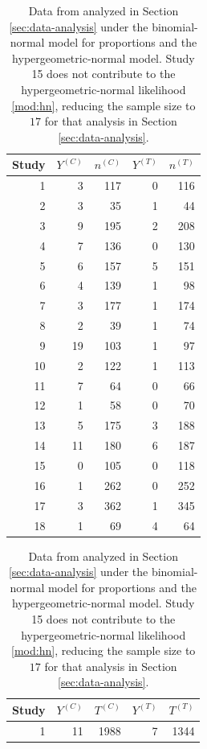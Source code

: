 \documentclass[12pt]{article}
\newcommand{\Y}{Y}
\newcommand{\T}[1]{{#1}^{(T)}}
\newcommand{\C}[1]{{#1}^{(C)}}
\newcommand{\n}{n}
\begin{document}
\begin{table}[htbp]
  \centering
  \begin{minipage}[t]{0.48\textwidth}
    \centering
    \begin{tabular}{rrrrr}
      \toprule
      Study & $\C{\Y}$ & $\C{\n}$ & $\T{\Y}$ & $\T{\n}$ \\
      \midrule
      1  & 3  & 117 & 0 & 116 \\
      2  & 3  & 35  & 1 & 44  \\
      3  & 9  & 195 & 2 & 208 \\
      4  & 7  & 136 & 0 & 130 \\
      5  & 6  & 157 & 5 & 151 \\
      6  & 4  & 139 & 1 & 98  \\
      7  & 3  & 177 & 1 & 174 \\
      8  & 2  & 39  & 1 & 74  \\
      9  & 19 & 103 & 1 & 97  \\
      10 & 2  & 122 & 1 & 113 \\
      11 & 7  & 64  & 0 & 66  \\
      12 & 1  & 58  & 0 & 70  \\
      13 & 5  & 175 & 3 & 188 \\
      14 & 11 & 180 & 6 & 187 \\
      15 & 0  & 105 & 0 & 118 \\
      16 & 1  & 262 & 0 & 252 \\
      17 & 3  & 362 & 1 & 345 \\
      18 & 1  & 69  & 4 & 64  \\
      \bottomrule
    \end{tabular}
    \caption{Data from \citet{niel:07} analyzed in Section \ref{sec:data-analysis} under the binomial-normal model for proportions and the hypergeometric-normal model. Study 15 does not contribute to the hypergeometric-normal likelihood \eqref{mod:hn}, reducing the sample size to $17$ for that analysis in Section \ref{sec:data-analysis}.}
    \label{tab:niel-weise-07}
  \end{minipage}%
  \hfill
  \begin{minipage}[t]{0.48\textwidth}
    \centering
    \begin{tabular}{rrrrr}
      \toprule
      Study & $\C{\Y}$ & $\C{T}$ & $\T{\Y}$ & $\T{T}$ \\
      \midrule
      1 & 11 & 1988  & 7  & 1344  \\

\end{tabular}
\end{minipage}
\end{table}
\end{document}
